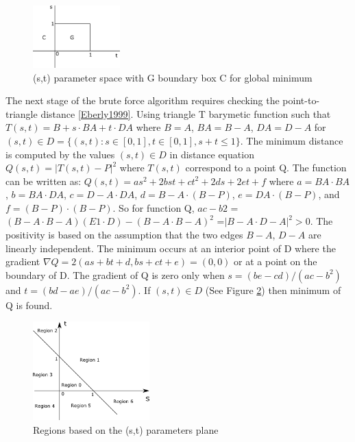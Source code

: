 \begin{figure}[!h]
\centering
\includegraphics[width=0.3\textwidth]{sketches/ss_box} 
\caption{(s,t) parameter space with G boundary box C for global minimum}
\label{figure:ss_regions}
\end{figure} 

The next stage of the brute force algorithm requires checking the point-to-triangle distance \ref{Eberly1999}. Using triangle T barymetic function such that $T(s, t) = B + s \cdot BA + t \cdot DA$ where $B = A$, $BA = B - A$, $DA = D - A$ for $(s,t) \in D = \{(s,t) : s \in [0,1],t \in [0,1],s + t ≤ 1\}$. The minimum distance is computed by the values $(s, t) \in D$ in distance equation $Q(s, t) = |T(s, t) - P|^2$ where $T(s,t)$ correspond to a point Q. The function can be written as: 
$Q(s,t)=as^2 +2bst+ct^2 +2ds+2et+f$ where $a = BA \cdot BA$, $b = BA \cdot DA$, $c = D-A \cdot DA$, $d = B-A \cdot (B - P)$, $e = DA \cdot (B - P)$, and $f = (B - P) \cdot (B - P)$. So for function Q, $ac - b2$ = $(B-A \cdot B-A)(E1 \cdot D) - (B-A \cdot B-A)^2$ =$|B-A \cdot D-A|^2 >0$. The positivity is based on the assumption that the two edges $B-A$, $D-A$ are linearly independent. The minimum occurs at an interior point of D where the gradient $\nabla Q = 2(as + bt + d, bs + ct + e) = (0, 0)$ or at a point on the boundary of D. The gradient of Q is zero only when $s = (be - cd)/(ac - b^2)$ and $t = (bd - ae)/(ac - b^2).$  If $(s,t) \in D$ (See Figure \ref{figure:pt_regions}) then minimum of Q is found. 

\begin{figure}[!h]
\centering
\includegraphics[width=0.4\textwidth]{sketches/pt_regions} 
\caption{Regions based on the (s,t) parameters plane}
\label{figure:pt_regions}
\end{figure}

